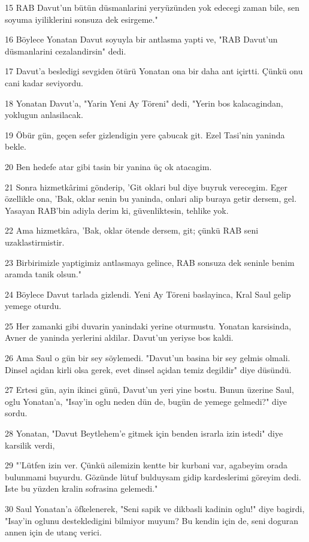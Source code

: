 \par 15 RAB Davut'un bütün düsmanlarini yeryüzünden yok edecegi zaman bile, sen soyuma iyiliklerini sonsuza dek esirgeme."
\par 16 Böylece Yonatan Davut soyuyla bir antlasma yapti ve, "RAB Davut'un düsmanlarini cezalandirsin" dedi.
\par 17 Davut'a besledigi sevgiden ötürü Yonatan ona bir daha ant içirtti. Çünkü onu cani kadar seviyordu.
\par 18 Yonatan Davut'a, "Yarin Yeni Ay Töreni" dedi, "Yerin bos kalacagindan, yoklugun anlasilacak.
\par 19 Öbür gün, geçen sefer gizlendigin yere çabucak git. Ezel Tasi'nin yaninda bekle.
\par 20 Ben hedefe atar gibi tasin bir yanina üç ok atacagim.
\par 21 Sonra hizmetkârimi gönderip, 'Git oklari bul diye buyruk verecegim. Eger özellikle ona, 'Bak, oklar senin bu yaninda, onlari alip buraya getir dersem, gel. Yasayan RAB'bin adiyla derim ki, güvenliktesin, tehlike yok.
\par 22 Ama hizmetkâra, 'Bak, oklar ötende dersem, git; çünkü RAB seni uzaklastirmistir.
\par 23 Birbirimizle yaptigimiz antlasmaya gelince, RAB sonsuza dek seninle benim aramda tanik olsun."
\par 24 Böylece Davut tarlada gizlendi. Yeni Ay Töreni baslayinca, Kral Saul gelip yemege oturdu.
\par 25 Her zamanki gibi duvarin yanindaki yerine oturmustu. Yonatan karsisinda, Avner de yaninda yerlerini aldilar. Davut'un yeriyse bos kaldi.
\par 26 Ama Saul o gün bir sey söylemedi. "Davut'un basina bir sey gelmis olmali. Dinsel açidan kirli olsa gerek, evet dinsel açidan temiz degildir" diye düsündü.
\par 27 Ertesi gün, ayin ikinci günü, Davut'un yeri yine bostu. Bunun üzerine Saul, oglu Yonatan'a, "Isay'in oglu neden dün de, bugün de yemege gelmedi?" diye sordu.
\par 28 Yonatan, "Davut Beytlehem'e gitmek için benden israrla izin istedi" diye karsilik verdi,
\par 29 "'Lütfen izin ver. Çünkü ailemizin kentte bir kurbani var, agabeyim orada bulunmami buyurdu. Gözünde lütuf bulduysam gidip kardeslerimi göreyim dedi. Iste bu yüzden kralin sofrasina gelemedi."
\par 30 Saul Yonatan'a öfkelenerek, "Seni sapik ve dikbasli kadinin oglu!" diye bagirdi, "Isay'in oglunu destekledigini bilmiyor muyum? Bu kendin için de, seni doguran annen için de utanç verici.

